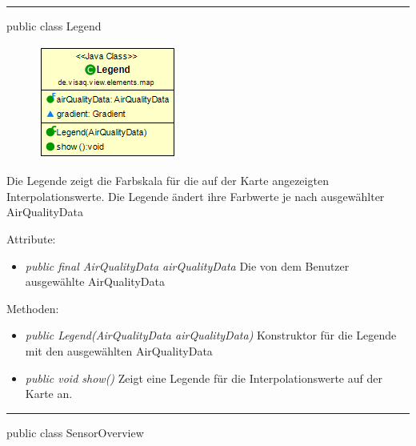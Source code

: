 \clearpage %

\rule{\textwidth}{0.4pt}
public class Legend

\begin{minipage}{0.3\textwidth}
    \begin{figure}[H]
        \includegraphics[scale = 0.6]{media/frontend/view/de.view.elements.map/Legend_Class.png}
    \end{figure}
    \end{minipage} \hfill
    \begin{minipage}{0.6\textwidth}
Die Legende zeigt die Farbskala für die auf der Karte angezeigten Interpolationswerte. Die Legende ändert ihre Farbwerte je nach ausgewählter AirQualityData
\end{minipage}

Attribute:
\begin{itemize}
    \item \emph{public final AirQualityData airQualityData} Die von dem Benutzer ausgewählte AirQualityData
\end{itemize}
Methoden:
\begin{itemize}
    \item \emph{public Legend(AirQualityData airQualityData)} Konstruktor für die Legende mit den ausgewählten AirQualityData
    \item \emph{public void show()} Zeigt eine Legende für die Interpolationswerte auf der Karte an.
\end{itemize}
\clearpage %
\rule{\textwidth}{0.4pt}
public class SensorOverview

